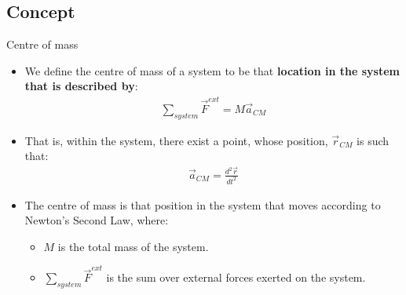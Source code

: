 \documentclass[aspectratio=169,
hyperref={colorlinks,urlcolor=blue}
]{beamer}
\begin{document}
\subsection{Concept}
\label{subsec:conceptcm}
\begin{frame}{Centre of mass}
\begin{itemize}
\item We define the centre of mass of a system to be that \textbf{location in the system that is described by}:
\begin{align*}
\sum_{system} \vec F^{ext}=M\vec a_{CM}
\end{align*}
\item That is, within the system, there exist a point, whose position, $\vec r_{CM}$ is such that:
\begin{align*}
\vec a_{CM}=\frac{d^2\vec r}{dt^2}
\end{align*}
\item The centre of mass is that position in the system that moves according to Newton’s Second Law, where:
\begin{itemize}
\item $M$ is the total mass of the system.
\item $\sum_{system} \vec F^{ext}$ is the sum over external forces exerted on the system.
\end{itemize}

\end{itemize}
\end{frame}




\end{document}
